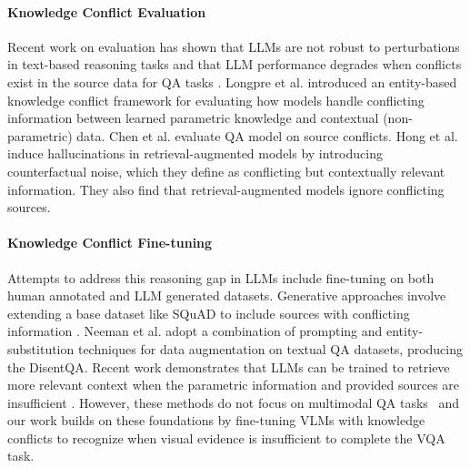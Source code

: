 \paragraph{Knowledge Conflict Evaluation}
Recent work on evaluation has shown that LLMs are not robust to perturbations in text-based reasoning tasks \citep{zhang_darg_2024,mirzadeh_gsm-symbolic_2024,zhu2023dyval,wang2024benchmark} and that LLM performance degrades when conflicts exist in the source data for QA tasks \cite{conflicts-main-survey,conflicts-survey-1}. Longpre et al. \citep{longpre_entity-based_2022} introduced an entity-based knowledge conflict framework for evaluating how models handle conflicting information between learned parametric knowledge and contextual (non-parametric) data. Chen et al. \citep{chen_rich_2022} evaluate QA model on source conflicts. Hong et al. \citep{hong_why_2024} induce hallucinations in retrieval-augmented models by introducing counterfactual noise, which they define as conflicting but contextually relevant information. They also find that retrieval-augmented models ignore conflicting sources. 

\paragraph{Knowledge Conflict Fine-tuning}
Attempts to address this reasoning gap in LLMs include fine-tuning on both human annotated \cite{dataset-hum-contradict-wiki,dataset-hum-contradict-claim} and LLM generated \cite{dataset-gen-attack,dataset-gen-contradoc,dataset-gen-contraqa} datasets. Generative approaches involve extending a base dataset like SQuAD \cite{dataset-squad} to include sources with conflicting information \cite{controllable-memory}. Neeman et al. adopt a combination of prompting and entity-substitution techniques for data augmentation on textual QA datasets, producing the DisentQA\citep{neeman_disentqa_2022}. Recent work demonstrates that LLMs can be trained to retrieve more relevant context when the parametric information and provided sources are insufficient \citep{labruna2024retrieve,wang2024learningretrieveincontextexamples}. However, these methods do not focus on multimodal QA tasks~\cite{conflicts-main-survey} and our work builds on these foundations by fine-tuning VLMs with knowledge conflicts to recognize when visual evidence is insufficient to complete the VQA task.


